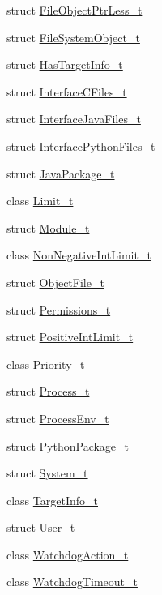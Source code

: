 \begin{DoxyCompactItemize}
\item 
struct \hyperlink{structmodel_1_1_file_object_ptr_less__t}{File\+Object\+Ptr\+Less\+\_\+t}
\item 
struct \hyperlink{structmodel_1_1_file_system_object__t}{File\+System\+Object\+\_\+t}
\item 
struct \hyperlink{structmodel_1_1_has_target_info__t}{Has\+Target\+Info\+\_\+t}
\item 
struct \hyperlink{structmodel_1_1_interface_c_files__t}{Interface\+C\+Files\+\_\+t}
\item 
struct \hyperlink{structmodel_1_1_interface_java_files__t}{Interface\+Java\+Files\+\_\+t}
\item 
struct \hyperlink{structmodel_1_1_interface_python_files__t}{Interface\+Python\+Files\+\_\+t}
\item 
struct \hyperlink{structmodel_1_1_java_package__t}{Java\+Package\+\_\+t}
\item 
class \hyperlink{classmodel_1_1_limit__t}{Limit\+\_\+t}
\item 
struct \hyperlink{structmodel_1_1_module__t}{Module\+\_\+t}
\item 
class \hyperlink{classmodel_1_1_non_negative_int_limit__t}{Non\+Negative\+Int\+Limit\+\_\+t}
\item 
struct \hyperlink{structmodel_1_1_object_file__t}{Object\+File\+\_\+t}
\item 
struct \hyperlink{structmodel_1_1_permissions__t}{Permissions\+\_\+t}
\item 
struct \hyperlink{structmodel_1_1_positive_int_limit__t}{Positive\+Int\+Limit\+\_\+t}
\item 
class \hyperlink{classmodel_1_1_priority__t}{Priority\+\_\+t}
\item 
struct \hyperlink{structmodel_1_1_process__t}{Process\+\_\+t}
\item 
struct \hyperlink{structmodel_1_1_process_env__t}{Process\+Env\+\_\+t}
\item 
struct \hyperlink{structmodel_1_1_python_package__t}{Python\+Package\+\_\+t}
\item 
struct \hyperlink{structmodel_1_1_system__t}{System\+\_\+t}
\item 
class \hyperlink{classmodel_1_1_target_info__t}{Target\+Info\+\_\+t}
\item 
struct \hyperlink{structmodel_1_1_user__t}{User\+\_\+t}
\item 
class \hyperlink{classmodel_1_1_watchdog_action__t}{Watchdog\+Action\+\_\+t}
\item 
class \hyperlink{classmodel_1_1_watchdog_timeout__t}{Watchdog\+Timeout\+\_\+t}
\end{DoxyCompactItemize}
